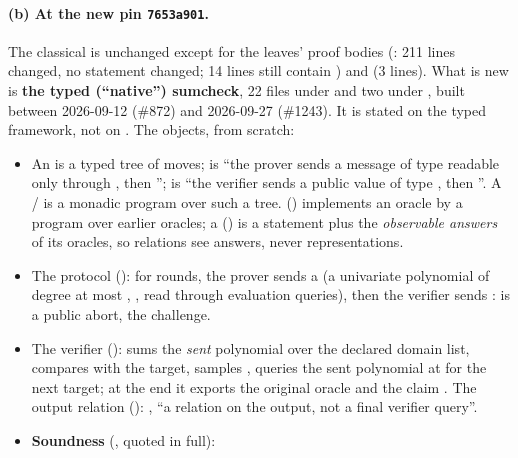 \paragraph{(b) At the new pin \texttt{7653a901}.}
The classical  is unchanged except for the  leaves' proof bodies
(: 211 lines changed, no statement changed; 14 lines still contain
) and  (3 lines). What is new is \textbf{the typed (``native'')
sumcheck}, 22 files under  and two under , built between
2026-09-12 (\#872) and 2026-09-27 (\#1243). It is stated on the typed 
framework, not on . The objects, from scratch:
\begin{itemize}
\item An  is a typed tree of moves;
   is ``the prover sends a message of type  readable
  only through , then ''; 
  is ``the verifier sends a public value of type , then ''. A
   /  is a monadic program over such a tree.
   () implements an oracle by a program
  over earlier oracles; a  () is a statement plus the
  \emph{observable answers} of its oracles, so relations see answers, never representations.
\item The protocol (): for  rounds, the
  prover sends a  (a univariate polynomial of degree at most ,
   , read through evaluation
  queries), then the verifier sends :  is a public abort, 
  the challenge.
\item The verifier (): sums the \emph{sent} polynomial over the
  declared domain list, compares with the target, samples , queries the sent polynomial at
   for the next target; at the end it exports the original oracle and the claim
  . The output relation ():
  , ``a relation on the
  output, not a final verifier query''.
\item \textbf{Soundness} (, quoted in full):
\end{itemize}
